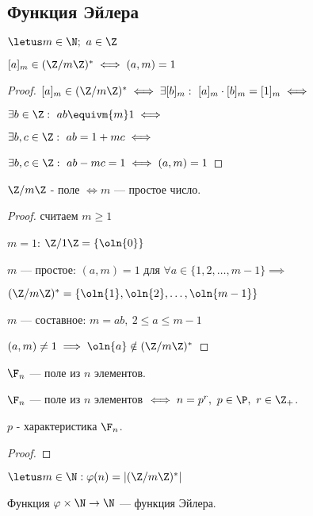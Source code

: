 \subsection{Функция Эйлера}

\begin{theorem-non}
    $\letus m \in \N;~a \in \Z$

    $[a]_m \in (\Z/m\Z)^* \iff (a, m) = 1$
\end{theorem-non}

\begin{proof}
    
    $[a]_m \in (\Z/m\Z)^* \iff \exists [b]_m:~[a]_m \cdot [b]_m = [1]_m \iff$
    
    $\exists b \in \Z:~ab \equivm{m} 1 \iff$
    
    $\exists b, c \in \Z:~ab = 1 + mc \iff$
    
    $\exists b, c \in \Z:~ab - mc = 1 \iff (a, m) = 1$
\end{proof}

\begin{follow}
    $\Z/m\Z$ - поле $\iff m$ --- простое число.
\end{follow}

\begin{proof}
    считаем $m \geq 1$
    
    $m = 1$: $\Z/1\Z = \{\oln{0}\}$
    
    $m$ --- простое: $(a, m) = 1$ для $\forall a \in \{1, 2, \ldots, m-1\} \implies$
    
    $(\Z/m\Z)^* = \{\oln{1}, \oln{2}, \ldots, \oln{m-1}\}$
    
    $m$ --- составное: $m = ab,~2 \leq a \leq m-1$
    
    $(a, m) \neq 1 \implies \oln{a} \notin (\Z/m\Z)^*$
\end{proof}

\begin{defn}
    $\F_{n}$ --- поле из $n$ элементов.
\end{defn}

\begin{theorem-non}
    $\F_{n}$ --- поле из $n$ элементов $\iff n = p^r,~ p \in \P,~ r \in \Z_{+}$.

    $p$ - характеристика $\F_{n}$.
\end{theorem-non}
\begin{proof}
\end{proof}
\begin{defn}
    $\letus m \in \N: \varphi(n) = |(\Z/m\Z)^*|$

    Функция $\varphi \times \N \to \N$ --- функция Эйлера.
\end{defn}

